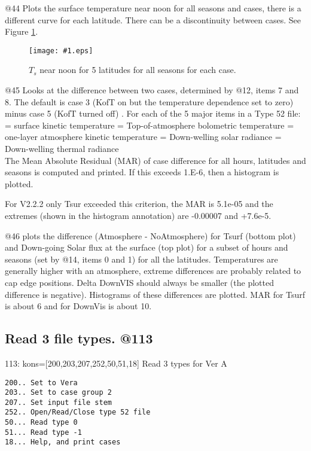 \documentclass{article}  %
\newcommand{\igc}[1]{\texttt{[image: \#1.eps]}}
\begin{document}
@44 Plots the surface temperature near noon for all seasons and cases, there is
a different curve for each latitude. There can be a discontinuity between
cases. See Figure \ref{p44}.

\begin{figure}[!ht] \igc{p44}
\caption[Ts versus season and latitude] { $T_s$ near noon for 5 latitudes for all seasons for each case.
\label{p44} } \end{figure}

@45 Looks at the difference between two cases, determined by @12, items 7 and
8. The default is case 3 (KofT on but the temperature dependence set to zero)
minus case 5 (KofT turned off) . For each of the 5 major items in a Type 52
file:
= surface kinetic temperature
= Top-of-atmosphere bolometric temperature
= one-layer atmosphere kinetic temperature
= Down-welling solar radiance 
= Down-welling thermal radiance
\\ The Mean Absolute Residual (MAR) of case difference for all hours, latitudes and seasons is computed and printed. If this exceeds 1.E-6, then a histogram is plotted.

For V2.2.2 only Tsur exceeded this criterion, the MAR is 5.1e-05 and the
extremes (shown in the histogram annotation) are -0.00007 and +7.6e-5.

@46 plots the difference (Atmosphere - NoAtmosphere) for Tsurf (bottom plot) and
Down-going Solar flux at the surface (top plot) for a subset of hours and
seasons (set by @14, items 0 and 1) for all the latitudes. Temperatures are
generally higher with an atmosphere, extreme differences are probably related to
cap edge positions. Delta DownVIS should always be smaller (the plotted
difference is negative).  Histograms of these differences are plotted.  MAR for
Tsurf is about 6 and for DownVis is about 10.

\subsection{Read 3 file types. @113  \label{a113} } %
 
113: kons=[200,203,207,252,50,51,18] Read 3 types for Ver A
\vspace{-3.mm} 
\begin{verbatim}
200.. Set to Vera
203.. Set to case group 2
207.. Set input file stem
252.. Open/Read/Close type 52 file
50... Read type 0
51... Read type -1
18... Help, and print cases
\end{verbatim}
\end{document}
